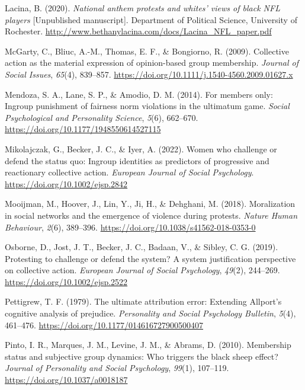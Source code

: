 \documentclass[twocolumn, 11pt, letterpaper]{article}
\newenvironment{CSLReferences}[2]{}{}
\begin{document}
\begin{CSLReferences}{1}{0}
\leavevmode{}%
Lacina, B. (2020). \emph{National anthem protests and whites' views of
black NFL players} {[}Unpublished manuscript{]}. Department of Political
Science, University of Rochester.
\url{http://www.bethanylacina.com/docs/Lacina_NFL_paper.pdf}

\leavevmode{}%
McGarty, C., Bliuc, A.-M., Thomas, E. F., \& Bongiorno, R. (2009).
Collective action as the material expression of opinion-based group
membership. \emph{Journal of Social Issues}, \emph{65}(4), 839--857.
\url{https://doi.org/10.1111/j.1540-4560.2009.01627.x}

\leavevmode{}%
Mendoza, S. A., Lane, S. P., \& Amodio, D. M. (2014). For members only:
Ingroup punishment of fairness norm violations in the ultimatum game.
\emph{Social Psychological and Personality Science}, \emph{5}(6),
662--670. \url{https://doi.org/10.1177/1948550614527115}

\leavevmode{}%
Mikolajczak, G., Becker, J. C., \& Iyer, A. (2022). Women who challenge
or defend the status quo: {Ingroup} identities as predictors of
progressive and reactionary collective action. \emph{European Journal of
Social Psychology}. \url{https://doi.org/10.1002/ejsp.2842}

\leavevmode{}%
Mooijman, M., Hoover, J., Lin, Y., Ji, H., \& Dehghani, M. (2018).
Moralization in social networks and the emergence of violence during
protests. \emph{Nature Human Behaviour}, \emph{2}(6), 389--396.
\url{https://doi.org/10.1038/s41562-018-0353-0}

\leavevmode{}%
Osborne, D., Jost, J. T., Becker, J. C., Badaan, V., \& Sibley, C. G.
(2019). Protesting to challenge or defend the system? {A} system
justification perspective on collective action. \emph{European Journal
of Social Psychology}, \emph{49}(2), 244--269.
\url{https://doi.org/10.1002/ejsp.2522}

\leavevmode{}%
Pettigrew, T. F. (1979). The ultimate attribution error: Extending
{Allport}'s cognitive analysis of prejudice. \emph{Personality and
Social Psychology Bulletin}, \emph{5}(4), 461--476.
\url{https://doi.org/10.1177/014616727900500407}

\leavevmode{}%
Pinto, I. R., Marques, J. M., Levine, J. M., \& Abrams, D. (2010).
Membership status and subjective group dynamics: Who triggers the black
sheep effect? \emph{Journal of Personality and Social Psychology},
\emph{99}(1), 107--119. \url{https://doi.org/10.1037/a0018187}


\end{CSLReferences}
\end{document}
